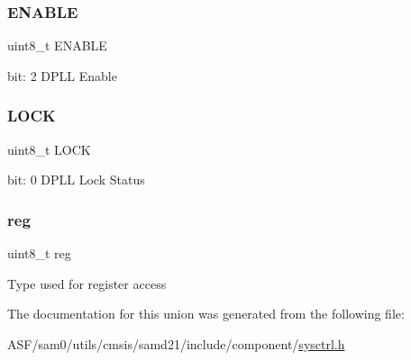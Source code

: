 \subsubsection{\texorpdfstring{ENABLE}{ENABLE}}
{\footnotesize\ttfamily uint8\+\_\+t E\+N\+A\+B\+LE}

bit\+: 2 D\+P\+LL Enable \mbox{\label{union_s_y_s_c_t_r_l___d_p_l_l_s_t_a_t_u_s___type_a4cf8c8b42c7b154ce36d4bb9723e01d1}} 
\subsubsection{\texorpdfstring{LOCK}{LOCK}}
{\footnotesize\ttfamily uint8\+\_\+t L\+O\+CK}

bit\+: 0 D\+P\+LL Lock Status \mbox{\label{union_s_y_s_c_t_r_l___d_p_l_l_s_t_a_t_u_s___type_a9428adc9af4653a2050e2536b55dec8d}} 
\subsubsection{\texorpdfstring{reg}{reg}}
{\footnotesize\ttfamily uint8\+\_\+t reg}

Type used for register access 

The documentation for this union was generated from the following file\+:\begin{DoxyCompactItemize}
\item 
A\+S\+F/sam0/utils/cmsis/samd21/include/component/\mbox{\hyperlink{component_2sysctrl_8h}{sysctrl.\+h}}\end{DoxyCompactItemize}
